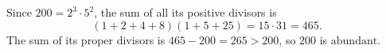 Since $200=2^3\cdot5^2$, the sum of all its positive divisors is
\[\left(1+2+4+8\right)\left(1+5+25\right)=15\cdot31=465.\]
The sum of its proper divisors is $465-200=265>200$, so $200$ is $\boxed{\text{abundant}}$.
